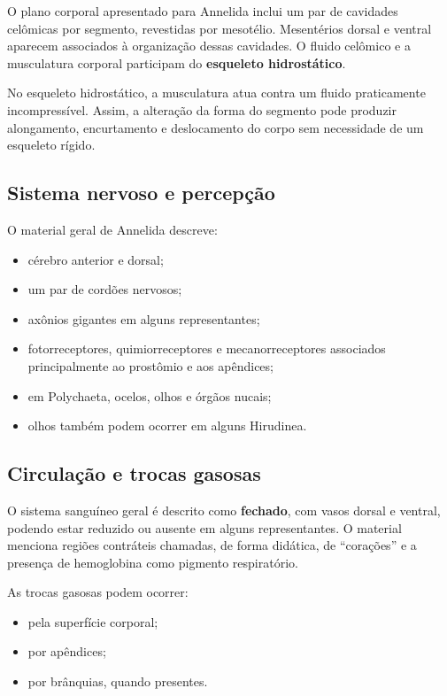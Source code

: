 \documentclass[a4paper,12pt]{article}
\newcommand{\termo}[1]{\textbf{#1}}
\begin{document}
O plano corporal apresentado para Annelida inclui um par de cavidades celômicas por segmento, revestidas por mesotélio. Mesentérios dorsal e ventral aparecem associados à organização dessas cavidades. O fluido celômico e a musculatura corporal participam do \termo{esqueleto hidrostático}.

\begin{conceito}
No esqueleto hidrostático, a musculatura atua contra um fluido praticamente incompressível. Assim, a alteração da forma do segmento pode produzir alongamento, encurtamento e deslocamento do corpo sem necessidade de um esqueleto rígido.
\end{conceito}

\subsection{Sistema nervoso e percepção}

O material geral de Annelida descreve:

\begin{itemize}
  \item cérebro anterior e dorsal;
  \item um par de cordões nervosos;
  \item axônios gigantes em alguns representantes;
  \item fotorreceptores, quimiorreceptores e mecanorreceptores associados principalmente ao prostômio e aos apêndices;
  \item em Polychaeta, ocelos, olhos e órgãos nucais;
  \item olhos também podem ocorrer em alguns Hirudinea.
\end{itemize}

\subsection{Circulação e trocas gasosas}

O sistema sanguíneo geral é descrito como \termo{fechado}, com vasos dorsal e ventral, podendo estar reduzido ou ausente em alguns representantes. O material menciona regiões contráteis chamadas, de forma didática, de ``corações'' e a presença de hemoglobina como pigmento respiratório.

As trocas gasosas podem ocorrer:

\begin{itemize}
  \item pela superfície corporal;
  \item por apêndices;
  \item por brânquias, quando presentes.
\end{itemize}
\end{document}
